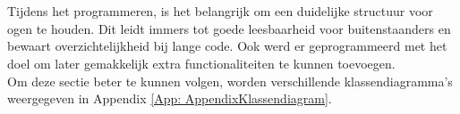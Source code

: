 \\
\\
Tijdens het programmeren, is het belangrijk om een duidelijke structuur voor ogen te houden. Dit leidt immers tot goede leesbaarheid voor buitenstaanders en bewaart overzichtelijkheid bij lange code. Ook werd er geprogrammeerd met het doel om later gemakkelijk extra functionaliteiten te kunnen toevoegen.
\\
Om deze sectie beter te kunnen volgen, worden verschillende klassendiagramma's weergegeven in Appendix \ref{App: AppendixKlassendiagram}.